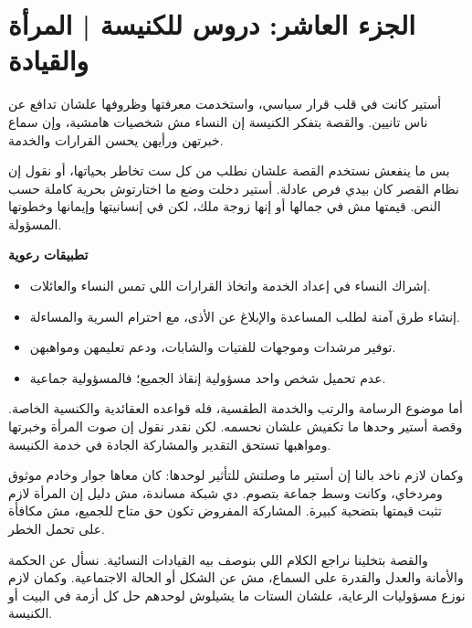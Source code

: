 \documentclass[12pt,a4paper]{article}
\begin{document}
\section*{الجزء العاشر: دروس للكنيسة | المرأة والقيادة}
أستير كانت في قلب قرار سياسي، واستخدمت معرفتها وظروفها علشان تدافع عن ناس تانيين. والقصة بتفكر الكنيسة إن النساء مش شخصيات هامشية، وإن سماع خبرتهن ورأيهن يحسن القرارات والخدمة.\par\medskip
بس ما ينفعش نستخدم القصة علشان نطلب من كل ست تخاطر بحياتها، أو نقول إن نظام القصر كان بيدي فرص عادلة. أستير دخلت وضع ما اختارتوش بحرية كاملة حسب النص. قيمتها مش في جمالها أو إنها زوجة ملك، لكن في إنسانيتها وإيمانها وخطوتها المسؤولة.\par\medskip
\vspace{0.2em}\noindent\textcolor{ochre}{\textbf{تطبيقات رعوية}}\par\smallskip
\begin{itemize}[rightmargin=1.2em,leftmargin=0.5em,itemsep=0.25em,topsep=0.2em]
\item إشراك النساء في إعداد الخدمة واتخاذ القرارات اللي تمس النساء والعائلات.
\item إنشاء طرق آمنة لطلب المساعدة والإبلاغ عن الأذى، مع احترام السرية والمساءلة.
\item توفير مرشدات وموجهات للفتيات والشابات، ودعم تعليمهن ومواهبهن.
\item عدم تحميل شخص واحد مسؤولية إنقاذ الجميع؛ فالمسؤولية جماعية.
\end{itemize}\medskip
أما موضوع الرسامة والرتب والخدمة الطقسية، فله قواعده العقائدية والكنسية الخاصة. وقصة أستير وحدها ما تكفيش علشان نحسمه. لكن نقدر نقول إن صوت المرأة وخبرتها ومواهبها تستحق التقدير والمشاركة الجادة في خدمة الكنيسة.\par\medskip
وكمان لازم ناخد بالنا إن أستير ما وصلتش للتأثير لوحدها: كان معاها جوار وخادم موثوق ومردخاي، وكانت وسط جماعة بتصوم. دي شبكة مساندة، مش دليل إن المرأة لازم تثبت قيمتها بتضحية كبيرة. المشاركة المفروض تكون حق متاح للجميع، مش مكافأة على تحمل الخطر.\par\medskip
والقصة بتخلينا نراجع الكلام اللي بنوصف بيه القيادات النسائية. نسأل عن الحكمة والأمانة والعدل والقدرة على السماع، مش عن الشكل أو الحالة الاجتماعية. وكمان لازم نوزع مسؤوليات الرعاية، علشان الستات ما يشيلوش لوحدهم حل كل أزمة في البيت أو الكنيسة.\par\medskip
\clearpage
\clearpage
\end{document}
